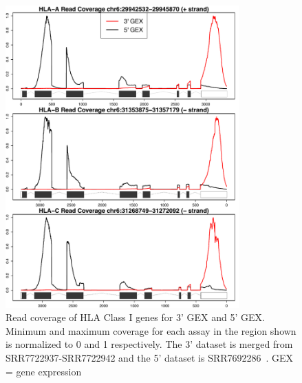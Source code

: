 \documentclass{article}[12pt]
\begin{document}
\begin{figure}
\includegraphics[width=0.8\textwidth]{figures/figureS2.pdf}
\caption{Read coverage of HLA Class I genes for 3' GEX and 5' GEX. Minimum and maximum coverage for each assay in the region shown is normalized to 0 and 1 respectively. The 3' dataset is merged from SRR7722937-SRR7722942 and the 5' dataset is SRR7692286~\parencite{Paulson2018}. GEX = gene expression}
\label{fig:coverage}
\end{figure}
\end{document}
